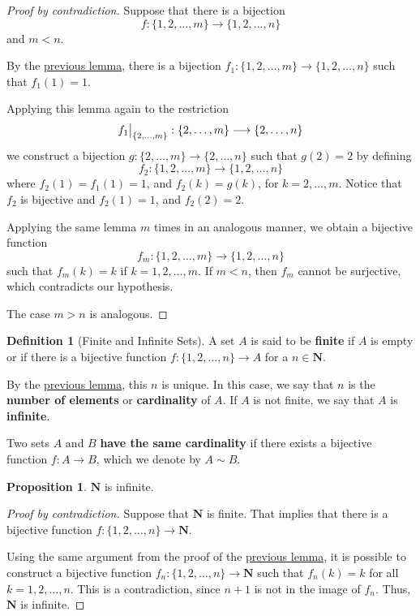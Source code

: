\documentclass[tikz,12pt,a4paper]{article}
\theoremstyle{definition}
\newtheorem{proposition}[theorem]{Proposition}
\newtheorem{definition}{Definition}[section]
\newcommand\restr[2]{{%
  \left.\kern-\nulldelimiterspace %
  #1 %
  \vphantom{\big|} %
  \right|_{#2} %
  }}
\begin{document}
\begin{proof}[Proof by contradiction]
	Suppose that there is a bijection 
	\[ f : \{ 1, 2, \ldots, m \} \longrightarrow \{ 1, 2, \ldots, n \} \]
	and $m<n$. 
	
	By the \hyperref[two-bij-fun]{previous lemma}, there is a bijection $f_1 : \{ 1, 2, \ldots, m \} \longrightarrow \{ 1, 2, \ldots, n \}$ such that $f_1(1) = 1$.
	
	Applying this lemma again to the restriction
	\[
	\restr{f_1}{\{ 2, \ldots, m \}} : \{ 2, \ldots, m \} \longrightarrow \{ 2, \ldots, n \}
	\]
	we construct a bijection $g : \{ 2, \ldots, m \} \longrightarrow \{ 2, \ldots, n \}$ such that $g(2) = 2$ by defining
	\[
	f_2 : \{ 1, 2, \ldots, m \} \longrightarrow \{ 1, 2, \ldots, n \}
	\]
	where $f_2(1) = f_1(1) = 1$, and $f_2(k) = g(k)$, for $k = 2, \ldots, m$. Notice that $f_2$ is bijective and $f_2(1) = 1$, and $f_2(2) = 2$.
	
	Applying the same lemma $m$ times in an analogous manner, we obtain a bijective function 
	\[ f_m : \{ 1, 2, \ldots, m \} \longrightarrow \{ 1, 2, \ldots, n \} \]
	such that $f_m(k) = k$ if $k = 1, 2, \ldots , m$. If $m<n$, then $f_m$ cannot be surjective, which contradicts our hypothesis.
	
	The case $m>n$ is analogous.
\end{proof}

\begin{definition}[Finite and Infinite Sets]
	A set $A$ is said to be \textbf{finite} if $A$ is empty or if there is a bijective function $ f : \{ 1, 2, \ldots, n \} \longrightarrow A$ for a $n \in \textbf{N}$.
	
	By the \hyperref[snd-lemma]{previous lemma}, this $n$ is unique. In this case, we say that $n$ is the \textbf{number of elements} or \textbf{cardinality} of $A$. If $A$ is not finite, we say that $A$ is \textbf{infinite}.
	
	Two sets $A$ and $B$ \textbf{have the same cardinality} if there exists a bijective function $f : A \longrightarrow B$, which we denote by $A \sim B$.
\end{definition}

\begin{proposition}\label{propninf}
	$\textbf{N}$ is infinite.
\end{proposition}

\begin{proof}[Proof by contradiction]
	Suppose that $\textbf{N}$ is finite. That implies that there is a bijective function $f : \{ 1, 2, \ldots, n \} \longrightarrow \textbf{N}$.
	
	Using the same argument from the proof of the \hyperref[snd-lemma]{previous lemma}, it is possible to construct a bijective function $f_n : \{ 1, 2, \ldots, n \} \longrightarrow \textbf{N}$ such that $f_n(k) = k$ for all $k = 1,2,\ldots , n$. This is a contradiction, since $n+1$ is not in the image of $f_n$. Thus, $\textbf{N}$ is infinite.
\end{proof}
\end{document}
